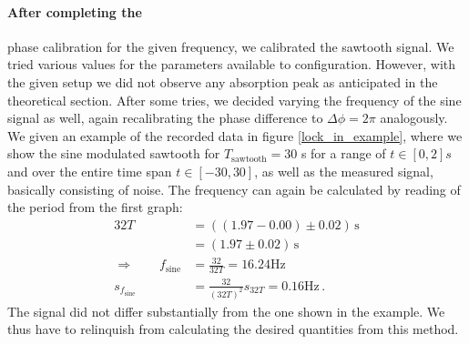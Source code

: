 \paragraph{After completing the} 
phase calibration for the given frequency, we calibrated the 
sawtooth signal. We tried various values for the parameters available to configuration. 
However, with the given setup we did not observe any absorption peak as anticipated in the 
theoretical section. After some tries, we decided varying the frequency of the sine signal as 
well, again recalibrating the phase difference to $\Delta \phi = 2 \pi$ analogously.  
We given an example of the recorded data in figure \ref{lock_in_example}, where we show 
the sine modulated sawtooth for $T_\mathrm{sawtooth} = 30$ s for a range of $t \in [0, 2] s$ and
over the entire time span $t \in [-30, 30]$, as well as 
the measured signal, basically consisting of noise. The frequency can again be calculated 
by reading of the period from the first graph:
\begin{align}
    32T  &= \left((1.97 - 0.00) \pm 0.02\right) \, \mathrm{s} \\
        &= (1.97 \pm 0.02) \, \mathrm{s} \\
    \Rightarrow \qquad f_\mathrm{sine} &= \frac{32}{32T} = 16.24 \mathrm{Hz} \\
    s_{f_\mathrm{sine}} &= \frac{32}{(32T)^2} s_{32T} = 0.16 \mathrm{Hz} \, .
\end{align}
The signal did not differ substantially from the one shown in the example. We thus have to 
relinquish from calculating the desired quantities from this method. 

\FloatBarrier
